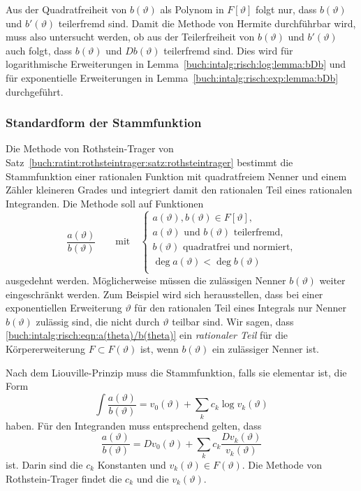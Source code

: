 Aus der Quadratfreiheit von $b(\vartheta)$ als Polynom in $F[\vartheta]$
folgt nur, dass $b(\vartheta)$ und $b'(\vartheta)$ teilerfremd sind.
Damit die Methode von Hermite durchführbar wird, muss also untersucht
werden, ob aus der Teilerfreiheit von $b(\vartheta)$ und $b'(\vartheta)$
auch folgt, dass $b(\vartheta)$ und $Db(\vartheta)$ teilerfremd sind.
Dies wird für logarithmische Erweiterungen in
Lemma~\ref{buch:intalg:risch:log:lemma:bDb} und für exponentielle
Erweiterungen in
Lemma~\ref{buch:intalg:risch:exp:lemma:bDb} durchgeführt.

%
%
\subsubsection{Standardform der Stammfunktion}
Die Methode von Rothstein-Trager von
Satz~\ref{buch:ratint:rothsteintrager:satz:rothsteintrager}
bestimmt die Stammfunktion einer rationalen Funktion mit quadratfreiem
Nenner und einem Zähler kleineren Grades und integriert damit den
rationalen Teil eines rationalen Integranden.
Die Methode soll auf Funktionen 
\begin{equation}
\frac{a(\vartheta)}{b(\vartheta)}
\qquad \text{mit}\quad \left\{
\begin{array}{l}
a(\vartheta),b(\vartheta)\in F[\vartheta],\\
\text{$a(\vartheta)$ und $b(\vartheta)$ teilerfremd,}\\
\text{$b(\vartheta)$ quadratfrei und normiert,}\\
\deg a(\vartheta) < \deg b(\vartheta)\\
\end{array}
\right.
\label{buch:intalg:risch:eqn:a(theta)/b(theta)}
\end{equation}
ausgedehnt werden.
Möglicherweise müssen die zulässigen Nenner $b(\vartheta)$ weiter
eingeschränkt werden.
Zum Beispiel wird sich herausstellen, dass bei einer exponentiellen
Erweiterung $\vartheta$ für den rationalen Teil eines
Integrals nur Nenner $b(\vartheta)$ zulässig sind, die nicht durch
$\vartheta$ teilbar sind.
Wir sagen, dass \eqref{buch:intalg:risch:eqn:a(theta)/b(theta)}
ein \emph{rationaler Teil} für die Körpererweiterung $F\subset F(\vartheta)$
ist, wenn $b(\vartheta)$ ein zulässiger Nenner ist.

Nach dem Liouville-Prinzip muss die Stammfunktion, falls sie elementar ist,
die Form
\begin{equation}
\int
\frac{a(\vartheta)}{b(\vartheta)}
=
v_0(\vartheta)
+
\sum_k c_k\log v_k(\vartheta)
\label{buch:intalg:risch:rt:eqn:liouvilleint}
\end{equation}
haben.
Für den Integranden muss entsprechend gelten, dass
\begin{equation}
\frac{a(\vartheta)}{b(\vartheta)}
=
Dv_0(\vartheta)
+
\sum_k c_k\frac{D v_k(\vartheta)}{v_k(\vartheta)}
\label{buch:intalg:risch:rt:eqn:liouvillediff}
\end{equation}
ist.
Darin sind die $c_k$ Konstanten und $v_k(\vartheta)\in F(\vartheta)$.
Die Methode von Rothstein-Trager findet die $c_k$ und die $v_k(\vartheta)$.

